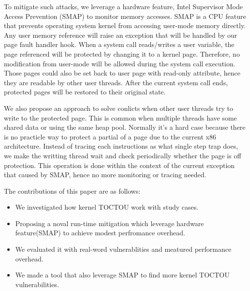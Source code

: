 To mitigate such attacks, we leverage a hardware feature, Intel Supervisor Mode Access Prevention (SMAP) to monitor memory accesses. SMAP is a CPU feature that prevents operating system kernel from accessing user-mode memory directly. Any user memory reference will raise an exception that will be handled by our page fault handler hook. When a system call reads/writes a user variable, the page referenced will be protected by changing it to a kernel page. Therefore, no modification from user-mode will be allowed during the system call execution. Those pages could also be set back to user page with read-only attribute, hence they are readable by other user threads. After the current system call ends, protected pages will be restored to their original state.

We also propose an approach to solve conlicts when other user threads try to write to the protected page. This is common when multiple threads have some shared data or using the same heap pool. Normally it's a hard case because there is no practicle way to protect a partial of a page due to the current x86 architecture. Instead of tracing each instructions as what single step trap does, we make the writting thread wait and check periodically whether the page is off protection. This operation is done within the context of the current exception that caused by SMAP, hence no more monitoring or tracing needed. 


The contributions of this paper are as follows:
\begin{itemize}
    \item We investigated how kernel TOCTOU work with study cases.
    \item Proposing a noval run-time mitigation which leverage hardware feature(SMAP) to achieve modest perfromance overhead. 
    \item We evaluated it with real-word vulnerablities and meatured performance overhead.
    \item We made a tool that also leverage SMAP to find more kernel TOCTOU vulnerabilities.
\end{itemize}

